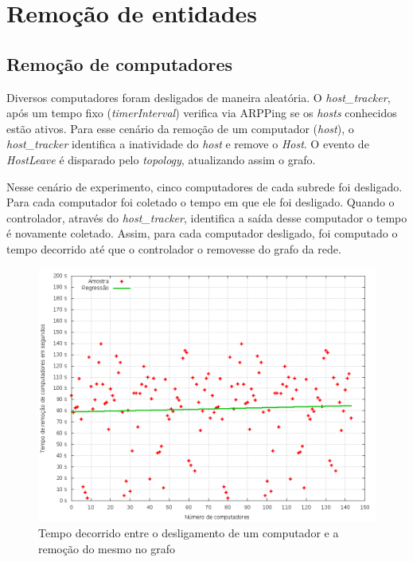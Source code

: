 \section{Remoção de entidades}

\subsection{Remoção de computadores}

Diversos computadores foram desligados de maneira aleatória.
O \emph{host\_tracker}, após um tempo fixo (\emph{timerInterval}) 
verifica via ARPPing se os \emph{hosts} conhecidos estão ativos.
Para esse cenário da remoção de um computador (\emph{host}), 
o \emph{host\_tracker} identifica a inatividade do \emph{host} e remove o 
\emph{Host}.
O evento de \emph{HostLeave} é disparado pelo \emph{topology}, 
atualizando assim o grafo.

Nesse cenário de experimento, cinco computadores de cada subrede foi desligado.
Para cada computador foi coletado o tempo em que ele foi desligado.
Quando o controlador, através do \emph{host\_tracker}, identifica a saída 
desse computador o tempo é novamente coletado.
Assim, para cada computador desligado, foi computado o tempo decorrido até 
que o controlador o removesse do grafo da rede.

\begin{figure}[h!]
    \centering
    \label{fig:hosts-leave-time}
    \includegraphics[width=\linewidth]{img/hosts-leave-time}
    \caption{Tempo decorrido entre o desligamento de um computador e a 
    remoção do mesmo no grafo}
\end{figure}

